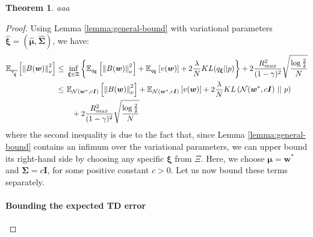 \documentclass{article}
\newtheorem{theorem}{Theorem}
\newcommand{\wh}[1]{\widehat{#1}}
\newcommand{\norm}[1]{\left\lVert #1 \right\rVert}
\begin{document}
\begin{theorem}\label{th:main-gaussian}
aaa
\end{theorem}
\begin{proof}
Using Lemma \ref{lemma:general-bound} with variational parameters $\wh{\bm{\xi}} = (\wh{\bm{\mu}},\wh{\bm{\Sigma}})$, we have:
\begin{align}\label{eq:thg-4}
\mathbb{E}_{q_{\wh{\bm{\xi}}}}\left[ \norm{B(\bm{w})}_{\nu}^2 \right ] \leq\ & \inf_{\bm{\xi} \in \Xi}\left\{ \mathbb{E}_{q_{\bm{\xi}}}\left[ \norm{B(\bm{w})}_{\nu}^2 \right ] + \mathbb{E}_{q_{\bm{\xi}}}\left[ v(\bm{w}) \right] + 2\frac{\lambda}{N} KL({q_{\bm{\xi}}}||p) \right\} + 2\frac{R_{max}^2}{(1-\gamma)^2}\sqrt{\frac{\log\frac{2}{\delta}}{N}}\notag\\ \leq\ & \mathbb{E}_{\mathcal{N}(\bm{w}^*,c\bm{I})}\left[ \norm{B(\bm{w})}_{\nu}^2 \right ] + \mathbb{E}_{\mathcal{N}(\bm{w}^*,c\bm{I})}\left[ v(\bm{w}) \right] + 2\frac{\lambda}{N} KL\left(\mathcal{N}(\bm{w}^*,c\bm{I})\ ||\ p\right)\notag\\ &\ \ + 2\frac{R_{max}^2}{(1-\gamma)^2}\sqrt{\frac{\log\frac{2}{\delta}}{N}}
\end{align}
where the second inequality is due to the fact that, since Lemma \ref{lemma:general-bound} contains an infimum over the variational parameters, we can upper bound its right-hand side by choosing any specific $\bm{\xi}$ from $\Xi$. Here, we choose $\bm{\mu} = \bm{w}^*$ and $\bm{\Sigma} = c\bm{I}$, for some positive constant $c>0$. Let us now bound these terms separately.

\paragraph*{Bounding the expected TD error}


\end{proof}
\end{document}
